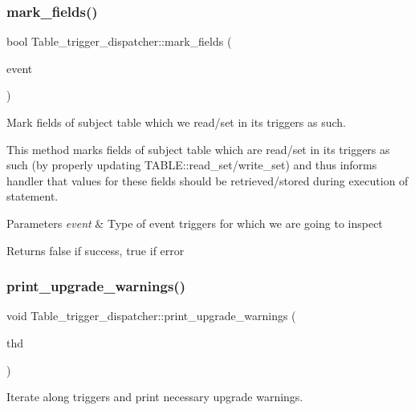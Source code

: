 \subsubsection{\texorpdfstring{mark\+\_\+fields()}{mark\_fields()}}
{\footnotesize\ttfamily bool Table\+\_\+trigger\+\_\+dispatcher\+::mark\+\_\+fields (\begin{DoxyParamCaption}\item[{\mbox{\hyperlink{trigger__def_8h_a25c92abc3a183d6950b0d9a4ee846e5e}{enum\+\_\+trigger\+\_\+event\+\_\+type}}}]{event }\end{DoxyParamCaption})}

Mark fields of subject table which we read/set in its triggers as such.

This method marks fields of subject table which are read/set in its triggers as such (by properly updating T\+A\+B\+L\+E\+::read\+\_\+set/write\+\_\+set) and thus informs handler that values for these fields should be retrieved/stored during execution of statement.


\begin{DoxyParams}{Parameters}
{\em event} & Type of event triggers for which we are going to inspect\\
\hline
\end{DoxyParams}
\begin{DoxyReturn}{Returns}
false if success, true if error 
\end{DoxyReturn}
\mbox{\label{classTable__trigger__dispatcher_a30896a7deaa5b4f2c8d638367ca5fac3}} 
\subsubsection{\texorpdfstring{print\+\_\+upgrade\+\_\+warnings()}{print\_upgrade\_warnings()}}
{\footnotesize\ttfamily void Table\+\_\+trigger\+\_\+dispatcher\+::print\+\_\+upgrade\+\_\+warnings (\begin{DoxyParamCaption}\item[{T\+HD $\ast$}]{thd }\end{DoxyParamCaption})}

Iterate along triggers and print necessary upgrade warnings.

